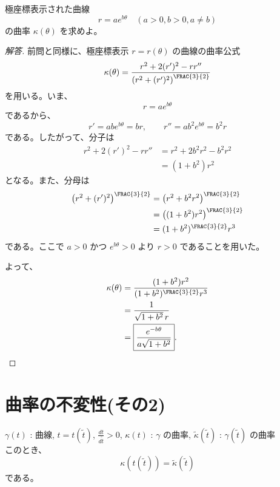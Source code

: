 \documentclass[article,paper=a4paper]{jlreq}
\begin{document}
\begin{prob}
    極座標表示された曲線
    \[ r = ae^{b\theta} \quad (a > 0, b > 0, a \neq b) \]
    の曲率 $\kappa(\theta)$ を求めよ。
\end{prob}

\begin{proof}[解答]
    前問と同様に、極座標表示 $r=r(\theta)$ の曲線の曲率公式
    \[
        \kappa(\theta)
        =
        \frac{r^2+2(r')^2-rr''}
        {\left(r^2+(r')^2\right)^{\FRAC{3}{2}}}
    \]
    を用いる。いま、
    \[
        r=ae^{b\theta}
    \]
    であるから、
    \[
        r'=abe^{b\theta}=br,\qquad
        r''=ab^2e^{b\theta}=b^2r
    \]
    である。したがって、分子は
    \begin{align*}
        r^2+2(r')^2-rr''
        &=
        r^2+2b^2r^2-b^2r^2\\
        &=
        (1+b^2)r^2
    \end{align*}
    となる。また、分母は
    \begin{align*}
        \left(r^2+(r')^2\right)^{\FRAC{3}{2}}
        &=
        \left(r^2+b^2r^2\right)^{\FRAC{3}{2}}\\
        &=
        \left((1+b^2)r^2\right)^{\FRAC{3}{2}}\\
        &=
        (1+b^2)^{\FRAC{3}{2}}r^3
    \end{align*}
    である。ここで $a>0$ かつ $e^{b\theta}>0$ より $r>0$ であることを用いた。

    よって、
    \begin{align*}
        \kappa(\theta)
        &=
        \frac{(1+b^2)r^2}{(1+b^2)^{\FRAC{3}{2}}r^3}\\
        &=
        \frac{1}{\sqrt{1+b^2}\,r}\\
        &=
        \boxed{
        \frac{e^{-b\theta}}{a\sqrt{1+b^2}}
        }.
    \end{align*}
\end{proof}

\section{曲率の不変性(その2)}

\begin{thm}
    \quad $\gamma(t)$ : 曲線, $t = t(\tilde{t})$, $\frac{dt}{d\tilde{t}} > 0$, $\kappa(t)$ : $\gamma$ の曲率, $\tilde{\kappa}(\tilde{t})$ : $\gamma(\tilde{t})$ の曲率\\
    このとき、
    \[\kappa(t(\tilde{t})) = \tilde{\kappa}(\tilde{t})\]
    である。 
\end{thm}
\end{document}
